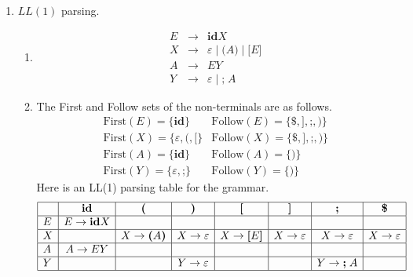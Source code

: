 \documentclass[11pt]{article}
\begin{document}
\begin{enumerate}
	\item $LL(1)$ parsing.
		\begin{enumerate}
			\item
				\begin{eqnarray*}
					E & \rightarrow & \mathbf{id} X \\
					X & \rightarrow & \varepsilon \mid \textbf{(} A \textbf{)}
					\mid \textbf{[} E \textbf{]} \\
					A & \rightarrow & E Y \\
					Y & \rightarrow & \varepsilon \mid \textbf{;} \; A
				\end{eqnarray*}
			\item The First and Follow sets of the non-terminals are as follows.
				\[
					\begin{array}{ll}
						\mathrm{First}(E) = \{ \mathbf{id} \}
						& \mathrm{Follow}(E)
						= \{ \textbf{\$}, \textbf{]}, \textbf{;}, \textbf{)} \} \\
						\mathrm{First}(X) = \{ \varepsilon, \textbf{(}, \textbf{[} \}
						& \mathrm{Follow}(X)
						= \{ \textbf{\$}, \textbf{]}, \textbf{;}, \textbf{)} \} \\
						\mathrm{First}(A) = \{ \mathbf{id} \}
						& \mathrm{Follow}(A) = \{ \textbf{)} \} \\
						\mathrm{First}(Y) = \{ \varepsilon, \textbf{;} \}
						& \mathrm{Follow}(Y) = \{ \textbf{)} \}
					\end{array}
				\]
				Here is an LL(1) parsing table for the grammar.
				\[
					\begin{array}{|l|c|c|c|c|c|c|c|}
						\hline
						& \mathbf{id} & \textbf{(} & \textbf{)} & \textbf{[} & \textbf{]}
						& \textbf{;} & \textbf{\$} \\
						\hline
						E & E \rightarrow \mathbf{id} X & & & & & & \\
						\hline
						X & & X \rightarrow \textbf{(} A \textbf{)}
						& X \rightarrow \varepsilon & X \rightarrow \textbf{[} E \textbf{]}
						& X \rightarrow \varepsilon & X \rightarrow \varepsilon
						& X \rightarrow \varepsilon \\
						\hline
						A & A \rightarrow EY & & & & & & \\
						\hline
						Y & & & Y \rightarrow \varepsilon & & & Y \rightarrow \textbf{;} \; A
						& \\
						\hline
					\end{array}
				\]
		

\end{enumerate}
\end{enumerate}
\end{document}
